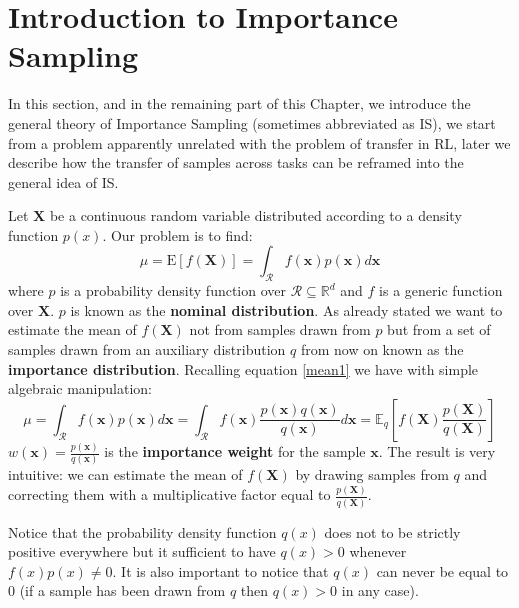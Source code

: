 \section{Introduction to Importance Sampling}
  \noindent In this section, and in the remaining part of this Chapter, we introduce the general theory of Importance Sampling (sometimes abbreviated as IS), we start from a problem apparently
  unrelated with the problem of transfer in RL, later we describe how the transfer of samples across tasks can be reframed into
  the general idea of IS.\newline

  \noindent Let $\pmb{X}$ be a continuous random variable distributed according to a density function $p(x)$. Our problem is to find:
  \begin{equation}
    \mu = \mathrm{E}[f(\pmb{X})] = \int_{\mathcal{R}} f(\pmb{x})p(\pmb{x}) d\pmb{x}
    \label{mean1}
  \end{equation}
  \noindent where $p$ is a probability density function over $\mathcal{R} \subseteq \mathbb{R}^{d}$ and $f$ is a
  generic function over $\pmb{X}$. $p$ is known as the \textbf{nominal distribution}.\newline
  As already stated we want to estimate the mean of $f(\pmb{X})$ not from samples drawn from $p$ but from a set
  of samples drawn from an auxiliary distribution $q$ from now on known as the \textbf{importance distribution}.
  Recalling equation \ref{mean1} we have with simple algebraic manipulation:
  \begin{equation*}
    \mu = \int_{\mathcal{R}} f(\pmb{x})p(\pmb{x}) d\pmb{x} = \int_{\mathcal{R}} f(\pmb{x}) \frac{p(\pmb{x}) q(\pmb{x})}{q(\pmb{x})} d\pmb{x} =
     \mathbb{E}_{q} \left [f(\pmb{X})\frac{p(\pmb{X})}{q(\pmb{X})} \right ]
  \end{equation*}
  $w(\pmb{x}) = \frac{p(\pmb{x})}{q(\pmb{x})}$ is the \textbf{importance weight} for the sample $\pmb{x}$. The result
  is very intuitive: we can estimate the mean of $f(\pmb{X})$ by drawing samples from $q$ and correcting them
  with a multiplicative factor equal to $\frac{p(\pmb{X})}{q(\pmb{X})}$.\newline

  \noindent Notice that the probability density function $q(x)$ does not to be strictly positive everywhere but it sufficient
  to have $q(x) > 0$ whenever $f(x)p(x) \neq 0$. It is also important to notice that $q(x)$ can never be equal to 0
  (if a sample has been drawn from $q$ then $q(x) > 0$ in any case).\newline

